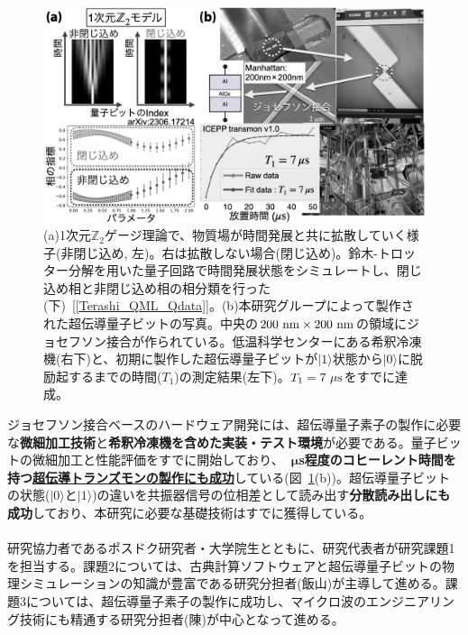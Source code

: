 \documentclass[11pt,a4j,dvipdfmx]{jarticle} 					%
\newcommand{\研究課題名}{誤り耐性量子コンピュータに向けた誤り訂正技術の開発(仮)}
\newcommand{\研究機関名}{東京大学}
\newcommand{\研究代表者氏名}{寺師弘二}
\newcommand{\研究期間の最終元号年度}{10}  %
\newcommand{\mybf}[1]{{\bfseries\sffamily#1}}
\newcommand{\maruone}{\raise0.2mm\hbox{\textcircled{\scriptsize{1}}}}
\newcommand{\marutwo}{\raise0.2mm\hbox{\textcircled{\scriptsize{2}}}}
\newcommand{\maruthree}{\raise0.2mm\hbox{\textcircled{\scriptsize{3}}}}
\begin{document}
\begin{figure}
	\begin{center}
		\vspace{-1cm}
		\includegraphics[width=11.3cm]{figs/result.png}\vspace{-0.4cm}
		\caption{\small{(a)1次元$\mathbb{Z}_2$ゲージ理論で、物質場が時間発展と共に拡散していく様子(非閉じ込め, 左)。右は拡散しない場合(閉じ込め)。鈴木-トロッター分解を用いた量子回路で時間発展状態をシミュレートし、閉じ込め相と非閉じ込め相の相分類を行った(下)~[\ref{Terashi_QML_Qdata}]。(b)本研究グループによって製作された超伝導量子ビットの写真。中央の$200~{\rm nm}\times200~{\rm nm}$の領域にジョセフソン接合が作られている。低温科学センターにある希釈冷凍機(右下)と、初期に製作した超伝導量子ビットが$|1\rangle$状態から$|0\rangle$に脱励起するまでの時間($T_1$)の測定結果(左下)。$T_1=7~\mu{\rm s}$をすでに達成。}
		\label{fig:status}}\vspace{-1cm}
	\end{center}
\end{figure}


ジョセフソン接合ベースのハードウェア開発には、超伝導量子素子の製作に必要な\mybf{微細加工技術}と\mybf{希釈冷凍機を含めた実装・テスト環境}が必要である。量子ビットの微細加工と性能評価をすでに開始しており、\mybf{10~$\boldsymbol{\mu}$s程度のコヒーレント時間を持つ\ul{超伝導トランズモンの製作にも成功}}している(図~\ref{fig:status}(b))。超伝導量子ビットの状態($|0\rangle$と$|1\rangle$)の違いを共振器信号の位相差として読み出す\mybf{分散読み出しにも成功}しており、本研究に必要な基礎技術はすでに獲得している。\vspace{-3mm}\\


\\
研究協力者であるポスドク研究者・大学院生とともに、研究代表者が研究課題{\maruone}を担当する。課題{\marutwo}については、古典計算ソフトウェアと超伝導量子ビットの物理シミュレーションの知識が豊富である研究分担者(飯山)が主導して進める。課題{\maruthree}については、超伝導量子素子の製作に成功し、マイクロ波のエンジニアリング技術にも精通する研究分担者(陳)が中心となって進める。
\end{document}
